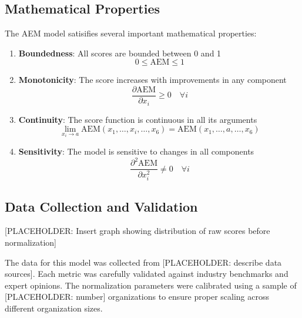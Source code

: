 \documentclass[12pt]{article}
\begin{document}
\subsection{Mathematical Properties}

The AEM model satisifies several important mathematical properties:

\begin{enumerate}
    \item \textbf{Boundedness}: All scores are bounded between 0 and 1
    \begin{equation}
        0 \leq \text{AEM} \leq 1
    \end{equation}
    
    \item \textbf{Monotonicity}: The score increases with improvements in any component
    \begin{equation}
        \frac{\partial \text{AEM}}{\partial x_i} \geq 0 \quad \forall i
    \end{equation}
    
    \item \textbf{Continuity}: The score function is continuous in all its arguments
    \begin{equation}
        \lim_{x_i \to a} \text{AEM}(x_1, \ldots, x_i, \ldots, x_6) = \text{AEM}(x_1, \ldots, a, \ldots, x_6)
    \end{equation}
    
    \item \textbf{Sensitivity}: The model is sensitive to changes in all components
    \begin{equation}
        \frac{\partial^2 \text{AEM}}{\partial x_i^2} \neq 0 \quad \forall i
    \end{equation}
\end{enumerate}

\subsection{Data Collection and Validation}

[PLACEHOLDER: Insert graph showing distribution of raw scores before normalization]

The data for this model was collected from [PLACEHOLDER: describe data sources]. Each metric was carefully validated against industry benchmarks and expert opinions. The normalization parameters were calibrated using a sample of [PLACEHOLDER: number] organizations to ensure proper scaling across different organization sizes.
\end{document}
